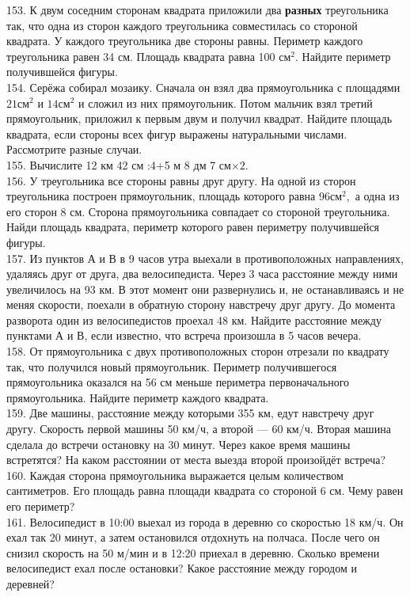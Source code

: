 153. К двум соседним сторонам квадрата приложили два {\bf разных} треугольника так, что одна из сторон каждого треугольника совместилась со стороной квадрата. У каждого треугольника две стороны равны. Периметр каждого треугольника равен 34 см. Площадь квадрата равна 100 $\text{см}^2.$ Найдите периметр получившейся фигуры.\\
154. Серёжа собирал мозаику. Сначала он взял два прямоугольника с площадями $21\text{см}^2$ и $14\text{см}^2$ и сложил из них прямоугольник. Потом мальчик взял третий прямоугольник, приложил к первым двум и получил квадрат. Найдите площадь квадрата, если стороны всех фигур выражены натуральными числами. Рассмотрите разные случаи.\\
155. Вычислите 12 км 42 см :4+5 м 8 дм 7 см$\times2.$\\
156. У треугольника все стороны равны друг другу. На одной из сторон треугольника построен прямоугольник, площадь которого равна $96\text{см}^2,$ а одна из его сторон 8 см. Сторона прямоугольника совпадает со стороной треугольника. Найди площадь квадрата, периметр которого равен периметру получившейся фигуры.\\
157. Из пунктов А и В в 9 часов утра выехали в противоположных направлениях, удаляясь друг от друга, два велосипедиста. Через 3 часа расстояние между ними увеличилось на 93 км. В этот момент они развернулись и, не останавливаясь и не меняя скорости, поехали в обратную сторону навстречу друг другу. До момента разворота один из велосипедистов проехал 48 км. Найдите расстояние между пунктами А и В, если известно, что встреча произошла в 5 часов вечера.\\
158. От прямоугольника с двух противоположных сторон отрезали по квадрату так, что получился новый прямоугольник. Периметр получившегося прямоугольника оказался на 56 см меньше периметра первоначального прямоугольника. Найдите периметр каждого квадрата.\\
159. Две машины, расстояние между которыми 355 км, едут навстречу друг другу. Скорость первой машины 50 км/ч, а второй --- 60 км/ч. Вторая машина сделала до встречи остановку на 30 минут. Через какое время машины встретятся? На каком расстоянии от места выезда второй произойдёт встреча?\\
160. Каждая сторона прямоугольника выражается целым количеством сантиметров. Его площадь равна площади квадрата со стороной 6 см. Чему равен его периметр?\\
161. Велосипедист в 10:00 выехал из города в деревню со скоростью 18 км/ч. Он ехал так 20 минут, а затем остановился отдохнуть на полчаса. После чего он снизил скорость на 50 м/мин и в 12:20 приехал в деревню. Сколько времени велосипедист ехал после остановки? Какое расстояние между городом и деревней?\\
